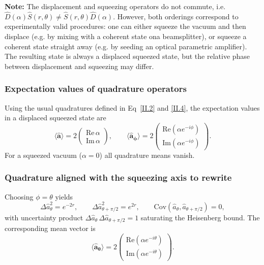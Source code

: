 \noindent \textbf{Note:}  The displacement and squeezing operators do not commute, i.e. $\hat{D}(\alpha)\hat{S}(r, \theta) \neq \hat{S}(r, \theta)\hat{D}(\alpha)$. However, both orderings correspond to experimentally valid procedures: one can either squeeze the vacuum and then displace (e.g. by mixing with a coherent state ona beamsplitter), or squeeze a coherent state straight away (e.g. by seeding an optical parametric amplifier). The resulting state is always a displaced squeezed state, but the relative phase between displacement and squeezing may differ.
\subsubsection*{Expectation values of quadrature operators}

Using the usual quadratures defined in Eq~\eqref{II.2} and \eqref{II.4}, the expectation values in a displaced squeezed state are
\begin{equation}
\langle \mathbf{\hat{a}} \rangle
= 2
\begin{pmatrix}
\mathrm{Re}\,\alpha \\[2pt]
\mathrm{Im}\,\alpha
\end{pmatrix}, 
\qquad
\langle \mathbf{\hat{a}_\phi} \rangle
= 2
\begin{pmatrix}
\mathrm{Re}\!\left(\alpha e^{-i\phi}\right) \\[2pt]
\mathrm{Im}\!\left(\alpha e^{-i\phi}\right)
\end{pmatrix}.
\label{II.xx3}
\end{equation}
For a squeezed vacuum ($\alpha=0$) all quadrature means vanish.

\subsubsection*{Quadrature aligned with the squeezing axis \color{red} to rewrite \color{black}}

Choosing $\phi = \theta$ yields
\begin{equation}
\Delta \hat a_\theta^2 = e^{-2r}, \qquad
\Delta \hat a_{\theta+\pi/2}^2 = e^{2r}, \qquad
\mathrm{Cov}(\hat a_\theta, \hat a_{\theta+\pi/2}) = 0,
\end{equation}
with uncertainty product $\Delta \hat a_\theta\, \Delta \hat a_{\theta+\pi/2} = 1$ saturating the Heisenberg bound.
The corresponding mean vector is
\begin{equation}
\langle \mathbf{\hat{a}_\theta} \rangle
= 2
\begin{pmatrix}
\mathrm{Re}(\alpha e^{-i\theta}) \\[2pt]
\mathrm{Im}(\alpha e^{-i\theta})
\end{pmatrix}.
\label{II.xx7}
\end{equation}

